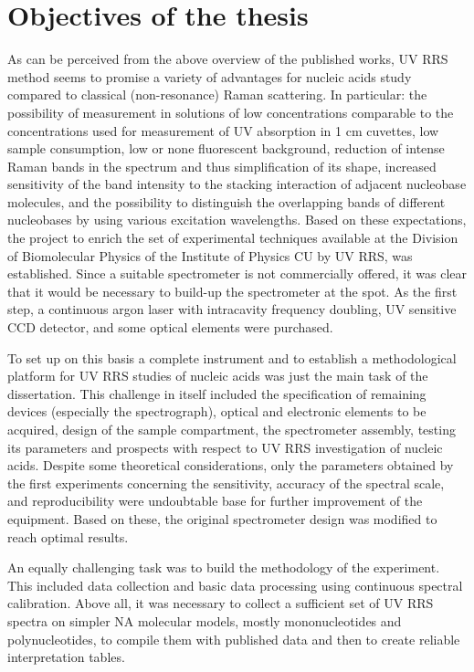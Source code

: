 \chapter{Objectives of the thesis}

As can be perceived from the above overview of the published works, UV RRS
method seems to promise a variety of advantages for nucleic acids study
compared to classical (non-resonance) Raman scattering.
In particular: the possibility of measurement in solutions of low
concentrations comparable to the concentrations used for measurement of
UV absorption in 1 cm cuvettes, low sample consumption, low or none fluorescent
background, reduction of intense Raman bands in the spectrum and thus
simplification of its shape, increased sensitivity of the band intensity to the
stacking interaction of adjacent nucleobase molecules, and the possibility to
distinguish the overlapping bands of different nucleobases by using various
excitation wavelengths.
Based on these expectations, the project to enrich the set of experimental
techniques available at the Division of Biomolecular Physics of the Institute
of Physics CU by UV RRS, was established. Since a suitable spectrometer is not
commercially offered, it was clear that it would be necessary to build-up the
spectrometer at the spot.
As the first step, a continuous argon laser with intracavity frequency
doubling, UV sensitive CCD detector, and some optical elements were purchased.

To set up on this basis a complete instrument and to establish a methodological
platform for UV RRS studies of nucleic acids was just the main task of the
dissertation.
This challenge in itself included the specification of remaining devices
(especially the spectrograph), optical and electronic elements to be acquired,
design of the sample compartment, the spectrometer assembly, testing its
parameters and prospects with respect to UV RRS investigation of nucleic acids.
Despite some theoretical considerations, only the parameters obtained by the
first experiments concerning the sensitivity, accuracy of the spectral scale,
and reproducibility were undoubtable base for further improvement of the
equipment.
Based on these, the original spectrometer design was modified to reach optimal
results.

An equally challenging task was to build the methodology of the experiment.
This included data collection and basic data processing using continuous
spectral calibration.
Above all, it was necessary to collect a sufficient set of UV RRS spectra on
simpler NA molecular models, mostly mononucleotides and polynucleotides, to
compile them with published data and then to create reliable interpretation
tables.

